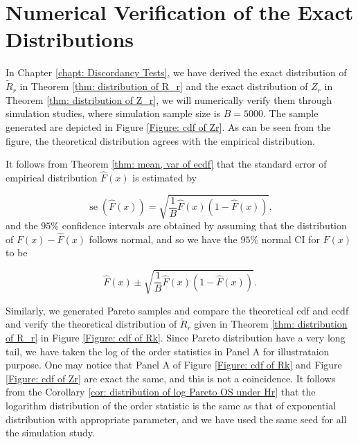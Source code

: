 \documentclass{report}
\DeclareMathOperator{\se}{se}
\begin{document}
\section{Numerical Verification of the Exact Distributions}

In Chapter \ref{chapt: Discordancy Tests}, we have derived the exact distribution of $\tilde R_r$ in Theorem \ref{thm: distribution of R_r} and the exact distribution of $Z_r$ in
Theorem \ref{thm: distribution of Z_r}, we will numerically verify them through simulation studies, where
simulation sample size is $B = 5000$. The sample generated are depicted in Figure \ref{Figure: cdf of Zr}.
As can be seen from the figure, the theoretical distribution agrees with the empirical distribution. 

It follows from Theorem \ref{thm: mean, var of ecdf} that the standard error of empirical distribution $\hat F(x)$ is estimated by 

\[   
\se(\hat F(x)) = \sqrt{\frac{1}{B}\hat F(x) (1- \hat F(x))},
\]
and the $95\%$ confidence intervals are obtained by assuming that the distribution
of $F(x) -\hat F(x)$ follows normal, and so we have the $95\%$ normal CI for $F(x)$ to be

\[ 
    \hat F(x) \pm \sqrt{\frac{1}{B}\hat F(x) (1- \hat F(x))}.
\]

Similarly, we generated Pareto samples and compare the theoretical cdf and ecdf and verify the
theoretical distribution of $\tilde R_r$ given in Theorem \ref{thm: distribution of R_r} in Figure \ref{Figure: cdf of Rk}. Since Pareto distribution
have a very long tail, we have taken the log of the order statistics in Panel A for illustrataion purpose. One may notice that Panel A of
Figure \ref{Figure: cdf of Rk} and Figure \ref{Figure: cdf of Zr} are exact the same, and this is not a coincidence. It follows from
the Corollary \ref{cor: distribution of log Pareto OS under Hr} that the logarithm distribution of the order statistic is the same
as that of exponential distribution with appropriate parameter, and we have used the same seed for all the simulation study.
\end{document}
